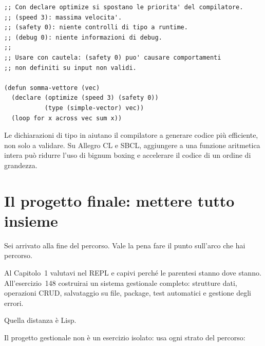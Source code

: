 \begin{esempio}
\begin{lstlisting}
;; Con declare optimize si spostano le priorita' del compilatore.
;; (speed 3): massima velocita'.
;; (safety 0): niente controlli di tipo a runtime.
;; (debug 0): niente informazioni di debug.
;;
;; Usare con cautela: (safety 0) puo' causare comportamenti
;; non definiti su input non validi.

(defun somma-vettore (vec)
  (declare (optimize (speed 3) (safety 0))
           (type (simple-vector) vec))
  (loop for x across vec sum x))
\end{lstlisting}
\end{esempio}

\begin{nota}
Le dichiarazioni di tipo in  aiutano il compilatore
a generare codice più efficiente, non solo a validare.
Su Allegro CL e SBCL, aggiungere  a una
funzione aritmetica intera può ridurre l'uso di bignum boxing
e accelerare il codice di un ordine di grandezza.
\end{nota}

\section{Il progetto finale: mettere tutto insieme}

Sei arrivato alla fine del percorso.
Vale la pena fare il punto sull'arco che hai percorso.

Al Capitolo~1 valutavi  nel REPL e capivi
perché le parentesi stanno dove stanno.
All'esercizio~148 costruirai un sistema gestionale completo:
strutture dati, operazioni CRUD, salvataggio su file,
package, test automatici e gestione degli errori.

Quella distanza è Lisp.


Il progetto gestionale non è un esercizio isolato:
usa ogni strato del percorso:

